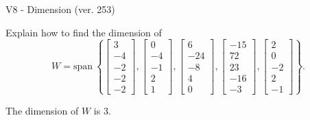 \begin{exercise}
  \begin{exerciseTitle}V8 - Dimension (ver. 253)\end{exerciseTitle}
  \begin{exerciseStatement}
    Explain how to find the dimension of 
\[W=\mathrm{span}\ \left\{\left[\begin{array}{r}
3 \\
-4 \\
-2 \\
-2 \\
-2
\end{array}\right] , \left[\begin{array}{r}
0 \\
-4 \\
-1 \\
2 \\
1
\end{array}\right] , \left[\begin{array}{r}
6 \\
-24 \\
-8 \\
4 \\
0
\end{array}\right] , \left[\begin{array}{r}
-15 \\
72 \\
23 \\
-16 \\
-3
\end{array}\right] , \left[\begin{array}{r}
2 \\
0 \\
-2 \\
2 \\
-1
\end{array}\right]\right\}.\]



  \end{exerciseStatement}
  \begin{exerciseAnswer}
   The dimension of \(W\) is  \(3\).
  


  \end{exerciseAnswer}
\end{exercise}